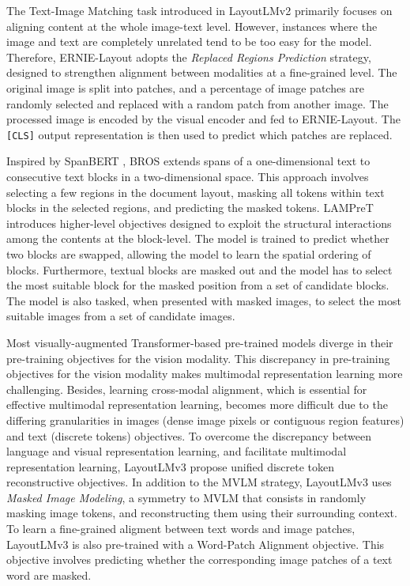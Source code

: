 \noindent The Text-Image Matching task introduced in LayoutLMv2 primarily focuses on aligning content at the whole image-text level. However, instances where the image and text are completely unrelated tend to be too easy for the model. Therefore, ERNIE-Layout adopts the \textit{Replaced Regions Prediction} strategy, designed to strengthen alignment between modalities at a fine-grained level. The original image is split into patches, and a percentage of image patches are randomly selected and replaced with a random patch from another image. The processed image is encoded by the visual encoder and fed to ERNIE-Layout. The \texttt{[CLS]} output representation is then used to predict which patches are replaced. 

Inspired by SpanBERT \citep{joshi2020spanbert}, BROS \citep{hong2021bros} extends spans of a one-dimensional text to consecutive text blocks in a two-dimensional space. This approach involves selecting a few regions in the document layout, masking all tokens within text blocks in the selected regions, and predicting the masked tokens. \ac{LAMPreT} \citep{wu2021lampret} introduces higher-level objectives designed to exploit the structural interactions among the contents at the block-level. The model is trained to predict whether two blocks are swapped, allowing the model to learn the spatial ordering of blocks. Furthermore, textual blocks are masked out and the model has to select the most suitable block for the masked position from a set of candidate blocks. The model is also tasked, when presented with masked images, to select the most suitable images from a set of candidate images. 

Most visually-augmented Transformer-based pre-trained models diverge in their pre-training objectives for the vision modality. This discrepancy in pre-training objectives for the vision modality makes multimodal representation learning more challenging. Besides, learning cross-modal alignment, which is essential for effective multimodal representation learning, becomes more difficult due to the differing granularities in images (dense image pixels or contiguous region features) and text (discrete tokens) objectives. To overcome the discrepancy between language and visual representation learning, and facilitate multimodal representation learning, LayoutLMv3 \citep{huang2022layoutlmv3} propose unified discrete token reconstructive objectives. In addition to the \ac{MVLM} strategy, LayoutLMv3 uses \textit{Masked Image Modeling}, a symmetry to \ac{MVLM} that consists in randomly masking image tokens, and reconstructing them using their surrounding context. To learn a fine-grained aligment between text words and image patches, LayoutLMv3 is also pre-trained with a Word-Patch Alignment objective. This objective involves predicting whether the corresponding image patches of a text word are masked. 


